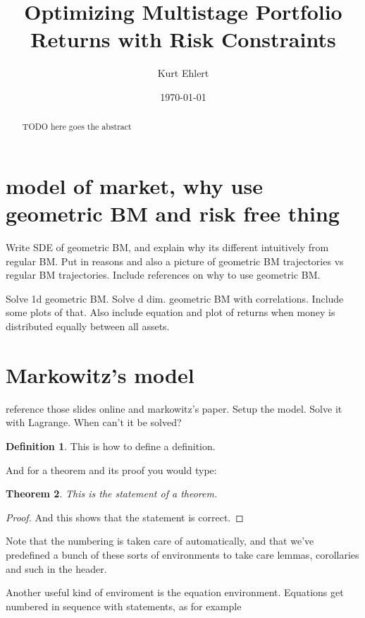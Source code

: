 \documentclass{amsart}
\title{Optimizing Multistage Portfolio Returns with Risk Constraints}
\author{Kurt Ehlert}
\date{\today}
\newtheorem{thm}{Theorem}[section]
\theoremstyle{definition}
\newtheorem{defn}[thm]{Definition}
\theoremstyle{remark}
\begin{document}
\begin{abstract}

TODO here goes the abstract

\end{abstract}

\maketitle

\tableofcontents

\section{model of market, why use geometric BM and risk free thing}

Write SDE of geometric BM, and explain why its different intuitively from regular BM. Put in reasons and also a picture of geometric BM trajectories vs regular BM trajectories. Include references on why to use geometric BM.\cite{hull}

Solve 1d geometric BM. Solve d dim. geometric BM with correlations. Include some plots of that. Also include equation and plot of returns when money is distributed equally between all assets.

\section{Markowitz's model}

reference those slides online and markowitz's paper. Setup the model. Solve it with Lagrange. When can't it be solved?

\begin{defn}  This is how to define a definition.
\end{defn}

And for a theorem and its proof you would type:

\begin{thm}
This is the statement of a theorem.
\end{thm}
\begin{proof}
And this shows that the statement is correct.
\end{proof}

Note that the numbering is taken care of automatically, and that we've predefined a bunch of these sorts of environments to take care lemmas, corollaries and such in the header. 

Another useful kind of enviroment is the equation environment.  Equations
get numbered in sequence with statements, as for example
\end{document}
